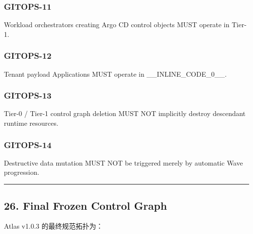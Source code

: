 \documentclass[11pt,a4paper]{article}
\begin{document}
\subsubsection{GITOPS-11}
Workload orchestrators creating Argo CD control objects MUST operate in Tier-1.

\subsubsection{GITOPS-12}
Tenant payload Applications MUST operate in \_\_INLINE\_CODE\_0\_\_.

\subsubsection{GITOPS-13}
Tier-0 / Tier-1 control graph deletion MUST NOT implicitly destroy descendant runtime resources.

\subsubsection{GITOPS-14}
Destructive data mutation MUST NOT be triggered merely by automatic Wave progression.

\vspace{0.5em}\hrule\vspace{0.5em}
\subsection{26. Final Frozen Control Graph}
Atlas v1.0.3 的最终规范拓扑为：
\end{document}
